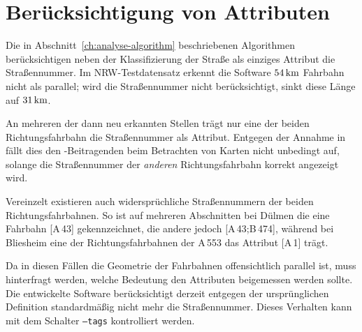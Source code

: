 \documentclass[../main/thesis.tex]{subfiles}
\begin{document}
\section{Berücksichtigung von Attributen}
\label{ch:result-tags}

Die in Abschnitt~\ref{ch:analyse-algorithm} beschriebenen Algorithmen berücksichtigen neben der Klassifizierung der Straße als einziges Attribut die Straßennummer.
Im NRW-Testdatensatz erkennt die Software $\unit[54]{km}$ Fahrbahn nicht als parallel; wird die Straßennummer nicht berücksichtigt, sinkt diese Länge auf $\unit[31]{km}$.

An mehreren der dann neu erkannten Stellen trägt nur eine der beiden Richtungsfahrbahn die Straßennummer als Attribut.
Entgegen der Annahme in \label{ch:case-selection} fällt dies den \osm-Beitragenden beim Betrachten von Karten nicht unbedingt auf, solange die Straßennummer der \emph{anderen} Richtungsfahrbahn korrekt angezeigt wird.

Vereinzelt existieren auch widersprüchliche Straßennummern der beiden Richtungsfahrbahnen.
So ist auf mehreren Abschnitten bei Dülmen die eine Fahrbahn [A\,43] gekennzeichnet, die andere jedoch [A\,43;B\,474], während bei Bliesheim eine der Richtungsfahrbahnen der A\,553 das Attribut [A\,1] trägt.

Da in diesen Fällen die Geometrie der Fahrbahnen offensichtlich parallel ist, muss hinterfragt werden, welche Bedeutung den Attributen beigemessen werden sollte.
%
%
Die entwickelte Software berücksichtigt derzeit entgegen der ursprünglichen Definition standardmäßig nicht mehr die Straßennummer.
Dieses Verhalten kann mit dem Schalter \texttt{--tags} kontrolliert werden.
\end{document}

